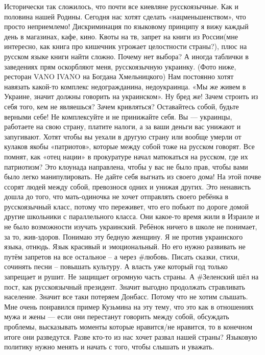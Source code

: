 Исторически так сложилось, что почти все киевляне русскоязычные. Как и половина нашей Родины. Сегодня нас хотят сделать «нацменьшенством», что просто неприемлемо!
Дискриминация по языковому принципу я вижу каждый день в магазинах, кафе, кино. Квоты на тв, запрет на книги из России(мне интересно, как книга про кишечник угрожает целостности страны?), плюс на русском языке книги найти сложно.
Почему нет выбора?
А иногда таблички в заведениях прям оскорбляют меня, русскоязычную украинку. (Фото ниже, ресторан VANO IVANO
 на Богдана Хмельницкого)
Нам постоянно хотят навязать какой-то комплекс недогражданина, недоукраинца. «Мы же живем в Украине, значит должны говорить на украинском». Ну бред же!
Зачем строить из себя того, кем не являешься? Зачем кривляться? Оставайтесь собой, будьте верными себе! Не комплексуйте и не принижайте себя. Вы — украинцы, работаете на свою страну, платите налоги, а за ваши деньги вас унижают и запугивают. Хотят чтобы вы уехали в другую страну или вообще умерли от кулаков якобы «патриотов», которые между собой тоже на русском говорят. Все помнят, как «отец нации» в прокуратуре начал матюкаться на русском, где их патриотизм?
Это клоунада направлена, чтобы у вас не было прав, чтобы вами было легко манипулировать. Не дайте себя выгнать из своего дома!
На этой почве ссорят людей между собой, превознося одних и унижая других. Это ненависть дошла до того, что мать-одиночка не хочет отправлять своего ребёнка в русскоязычный класс, потому что переживет, что его побьют по дороге домой другие школьники с параллельного класса. Они какое-то время жили в Израиле и не было возможности изучать украинский. Ребёнок ничего в школе не понимает, за то, жив-здоров. Понимаю эту бедную женщину.
Я не против украинского языка, отнюдь. Язык красивый и эмоциональный. Но его нужно развивать не путём запретов на все остальное – а через #любовь. Писать сказки, стихи, сочинять песни – повышать культуру. А власть уже который год только запрещает и рушит. Не защищает огромную часть страны. А #Зеленский шёл на пост, как русскоязычный президент.
Значит выгодно продолжать стравливать население. Значит все таки потеряем Донбасс. Потому что не хотим слышать. Мне очень понравился пример Кузьмина на эту тему, что это как в отношениях мужа и жены — если они перестанут говорить между собой, обсуждать проблемы, высказывать моменты которые нравится/не нравится, то в конечном итоге они разведутся. Разве кто-то из нас хочет развал нашей страны?
Языковую политику нужно менять и начать с того, чтобы слышать и уважать.
